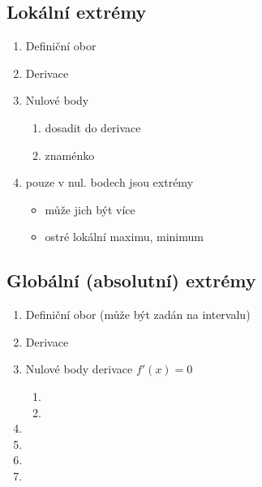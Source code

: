 \documentclass{article}
\begin{document}
\subsection{Lokální extrémy}
\begin{enumerate}
  \item Definiční obor
  \item Derivace
  \item Nulové body
    \begin{enumerate}[label=(\alph*)]
      \item dosadit do derivace
      \item znaménko
    \end{enumerate}
  \item pouze v nul. bodech jsou extrémy
    \begin{itemize}
      \item může jich být více
      \item ostré lokální maximu, minimum
    \end{itemize}
\end{enumerate}

\subsection{Globální (absolutní) extrémy}
\begin{enumerate}
  \item Definiční obor (může být zadán na intervalu)
  \item Derivace
  \item Nulové body derivace $f'(x)=0$
    \begin{enumerate}[label=(\alph*)]
      \item
      \item
    \end{enumerate}
  \item 
  \item
  \item
  \item
\end{enumerate}
\end{document}
